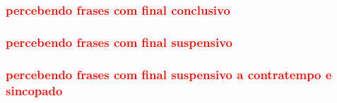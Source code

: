 \subsubsection{\textcolor{red}{percebendo frases com final conclusivo}}

\subsubsection{\textcolor{red}{percebendo frases com final suspensivo}}


\subsubsection{\textcolor{red}{percebendo frases com final suspensivo a contratempo e sincopado}}



